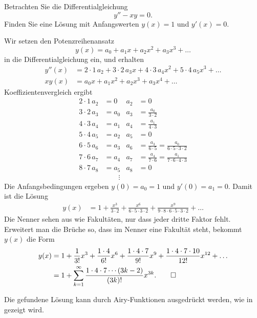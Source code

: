 Betrachten Sie die Differentialgleichung
\[
y'' - xy = 0.
\]
Finden Sie eine Lösung mit Anfangswerten $y(x)=1$ und $y'(x)=0$.

\begin{loesung}
Wir setzen den Potenzreihenansatz
\[
y(x) = a_0 + a_1x + a_2x^2 + a_3x^3+\dots
\]
in die Differentialgleichung ein, und erhalten
\begin{align*}
y''(x)
&=
2\cdot 1\, a_2 + 3\cdot 2\, a_3x + 4\cdot 3\, a_4x^2 + 5\cdot 4\,a_5x^3+\dots
\\
xy(x)
&=
a_0x + a_1x^2 + a_2x^3+a_3x^4+\dots
\end{align*}
Koeffizientenvergleich ergibt
\begin{align*}
2\cdot 1\,a_2 &= 0    &a_2&=0\\
3\cdot 2\,a_3 &= a_0  &a_3&=\frac{a_0}{3\cdot 2}\\
4\cdot 3\,a_4 &= a_1  &a_4&=\frac{a_1}{4\cdot 3}\\
5\cdot 4\,a_5 &= a_2  &a_5&=0\\
6\cdot 5\,a_6 &= a_3  &a_6&=\frac{a_3}{6\cdot 5}=\frac{a_0}{6\cdot 5\cdot 3\cdot 2}\\
7\cdot 6\,a_7 &= a_4  &a_7&=\frac{a_4}{7\cdot 6}=\frac{a_1}{7\cdot 6\cdot 4\cdot 3}\\
8\cdot 7\,a_8 &= a_5  &a_8&=0\\
              &\qquad\vdots
\end{align*}
Die Anfangsbedingungen ergeben $y(0)=a_0=1$ und $y'(0)=a_1=0$.
Damit ist die Lösung
\begin{align*}
y(x)
&=
1
+ \frac{x^3}{3\cdot 2}
+ \frac{x^6}{6\cdot 5\cdot 3\cdot 2}
+ \frac{x^9}{9\cdot 8\cdot 6\cdot 5\cdot 3\cdot 2}
+ \dots
\end{align*}
Die Nenner sehen aus wie Fakultäten, nur dass jeder dritte Faktor fehlt.
Erweitert man die Brüche so, dass im Nenner eine Fakultät steht, bekommt
$y(x)$ die Form
\begin{align*}
y(x)
&=
1
+ \frac{1}{3!}x^3
+ \frac{1\cdot 4}{6!}x^6
+ \frac{1\cdot 4\cdot 7}{9!}x^9
+ \frac{1\cdot 4\cdot 7\cdot 10}{12!}x^{12}
+ \dots
\\
&=
1 + \sum_{k=1}^\infty \frac{1\cdot 4\cdot 7\cdots (3k-2)}{(3k)!} x^{3k}.
\qedhere
\end{align*}
\end{loesung}

Die gefundene Lösung kann durch Airy-Funktionen ausgedrückt werden,
wie in \cite{skript:airy} gezeigt wird.


